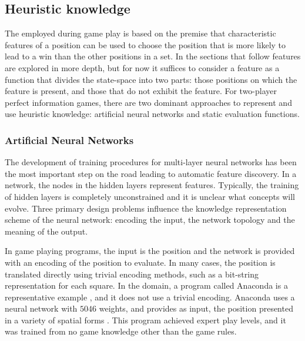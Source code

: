 \subsection{Heuristic knowledge}
\label{sec:heuristic}
The  employed during game play is based on the premise that characteristic features of a position can be used to choose the position that is more likely to lead to a win than the other positions in a set.  In the sections that follow features are explored in more depth, but for now it suffices to consider a feature as a function that divides the state-space into two parts:  those positions on which the feature is present, and those that do not exhibit the feature.   For two-player perfect information games, there are two dominant approaches to represent and use heuristic knowledge: artificial neural networks and static evaluation functions.  

\subsubsection{Artificial Neural Networks}
\label{sec:networks}


The development of training procedures for multi-layer neural networks has been the most important step on the road leading to automatic feature discovery.  In a network, the nodes in the hidden layers represent features.  Typically, the training of hidden layers is completely unconstrained and it is unclear what concepts will evolve.  Three primary design problems influence the knowledge representation scheme of the neural network: encoding the input, the network topology and the meaning of the output.   

In game playing programs, the input is the position and the network is provided with an encoding of the position to evaluate. In many cases, the position is translated directly using trivial encoding methods, such as a bit-string representation for each square. In the  domain, a program called Anaconda is a representative example \cite{chellapilla:defeats, chellapilla:without}, and it does not use a trivial encoding.  Anaconda uses a neural network with $5046$ weights, and provides as input, the position presented in a variety of spatial forms \cite{davis:evolve}. This program achieved expert play levels, and it was trained from no game knowledge other than the game rules.

